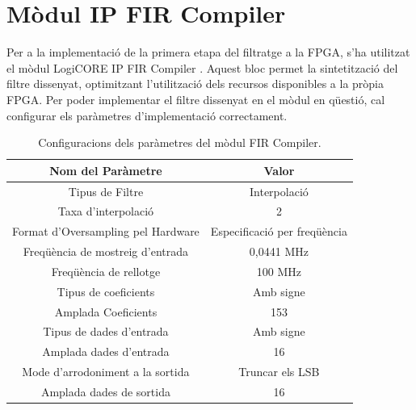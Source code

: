 \section{Mòdul IP FIR Compiler}
\par Per a la implementació de la primera etapa del filtratge a la FPGA, s'ha utilitzat el mòdul LogiCORE IP FIR Compiler \cite{FIRcompiler}. Aquest bloc permet la sintetització del filtre dissenyat, optimitzant l'utilització dels recursos disponibles a la pròpia FPGA. Per poder implementar el filtre dissenyat en el mòdul en qüestió, cal configurar els paràmetres d'implementació correctament. 
\begin{table}[H]
    \centering
    \begin{tabular}{ | c | c | }
    \hline
    \centering
    \textbf{Nom del Paràmetre}     &  \textbf{Valor}\\ [2ex] \hline
    \centering
    Tipus de Filtre    &    Interpolació \\ \hline
    \centering
    Taxa d'interpolació    &    2 \\ \hline
    \centering
    Format d'Oversampling pel Hardware &    Especificació per freqüència \\ \hline
    \centering
    Freqüència de mostreig d'entrada & 0,0441 MHz \\ \hline
    \centering
    Freqüència de rellotge &    100 MHz \\ \hline
    \centering
    Tipus de coeficients &  Amb signe \\ \hline
    \centering
    Amplada Coeficients & 153 \\ \hline
    \centering
    Tipus de dades d'entrada &  Amb signe \\ \hline
    \centering
    Amplada dades d'entrada &   16 \\ \hline
    \centering
    Mode d'arrodoniment a la sortida & Truncar els LSB \\ \hline
    \centering
    Amplada dades de sortida &  16\\ \hline
    \end{tabular}
    \caption{Configuracions dels paràmetres del mòdul FIR Compiler.}
    \label{taula_configFIR}
\end{table}

